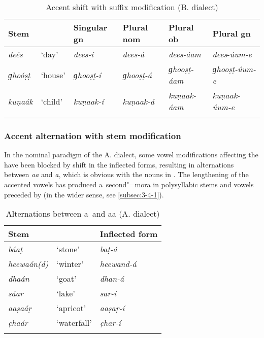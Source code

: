 \begin{table}[ht]
\caption{Accent shift with suffix modification (B. dialect)}
\begin{tabularx}{\textwidth}{ Q l l l l l }
\lsptoprule
Stem &
&
Singular gn &
Plural nom &
Plural ob &
Plural gn \\\hline
\textit{deés} &
`day' &
\textit{dees-í} &
\textit{dees-á} &
\textit{dees-áam} &
\textit{dees}-\textit{úum-e}\\
\textit{ɡhoóṣṭ} &
`house' &
\textit{ɡhooṣṭ-í} &
\textit{ɡhooṣṭ-á} &
\textit{ɡhooṣṭ-áam} &
\textit{ɡhooṣṭ-úum-e} \\
\textit{kuṇaák} &
`child' &
\textit{kuṇaak-í} &
\textit{kuṇaak-á} &
\textit{kuṇaak-áam} &
\textit{kuṇaak-úum-e} \\\lspbottomrule
\end{tabularx}
\label{tab:3-12}
\end{table}

\subsubsection*{Accent alternation with stem modification}

In the nominal paradigm of the A. dialect, some vowel modifications affecting the  have been blocked by  shift in the inflected forms, resulting in alternations between \textit{aa} and \textit{a}, which is obvious with the nouns in . The lengthening of the accented vowels has produced a~second"=mora  in polysyllabic stems and vowels preceded by  (in the wider sense, see \ref{subsec:3-4-1}). 

\begin{table}[ht]
\caption{Alternations between a~and aa (A. dialect)}
\begin{tabularx}{.75\textwidth}{ Q Q Q }
\lsptoprule
Stem &
&
Inflected form\\\hline
\textit{báaṭ} &
`stone' &
\textit{baṭ-á} \\
\textit{heewaán(d)} &
`winter' &
\textit{heewand-á} \\
\textit{dhaán} &
`goat' &
\textit{dhan-á}\\
\textit{sáar} &
`lake' &
\textit{sar-í}\\
\textit{aaṣaáṛ} &
`apricot' &
\textit{aaṣaṛ-í} \\
\textit{c̣haár} &
`waterfall' &
\textit{c̣har-í} \\\lspbottomrule
\end{tabularx}
\label{tab:3-13}
\end{table}


